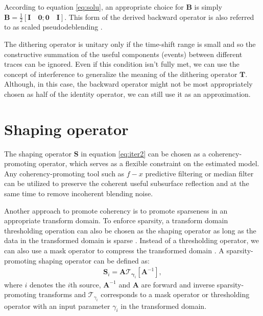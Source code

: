 According to equation \ref{eq:solu}, an appropriate choice for $\mathbf{B}$ is simply 
$\mathbf{B}=\frac{1}{2}[\mathbf{I}\quad\mathbf{0};\mathbf{0}\quad\mathbf{I}]$. This form of the derived backward operator is also referred to as scaled pseudodeblending \cite[]{arazthesis}.

The dithering operator is unitary only if the time-shift range is small and so the constructive summation of the useful components (events) between different traces can be ignored. Even if this condition isn't fully met, we can use the concept of interference to generalize the meaning of the dithering operator $\mathbf{T}$. Although, in this case, the backward operator might not be most appropriately chosen as half of the identity operator, we can still use it as an approximation.

\section{Shaping operator}
The shaping operator $\mathbf{S}$ in equation \ref{eq:iter2} can be chosen as a coherency-promoting operator, which serves as a flexible constraint on the estimated model.
Any coherency-promoting tool such as $f-x$ predictive filtering \cite[]{canales1984,sacchi2000,galbraith2012,yangkang2014} or median filter \cite[]{liuyang2009tvmf,mediandeblend,yike2013} can be utilized to preserve the coherent useful subsurface reflection and at the same time to remove incoherent blending noise. 

Another approach to promote coherency is to promote sparseness in an appropriate transform domain. To enforce sparsity, a transform domain thresholding operation can also be chosen as the shaping operator as long as the data in the transformed domain is sparse \cite[]{mallat2009,candes2010}. Instead of a thresholding operator, we can also use a mask operator to compress the transformed domain \cite[]{mostafa2010,liuyang2012}. A sparsity-promoting shaping operator can be defined as:
\begin{align}
\label{eq:sparse1}
\mathbf{S}_i =\mathbf{A}\mathbf{\mathcal{T}}_{\mathbf{\gamma}_i}[\mathbf{A}^{-1}], 
\end{align}
where $i$ denotes the $i$th source, $\mathbf{A}^{-1}$ and $\mathbf{A}$ are forward and inverse sparsity-promoting transforms and $\mathbf{\mathcal{T}}_{\gamma_i}$ corresponds to a mask operator or thresholding operator with an input parameter $\gamma_i$ in the transformed domain.

